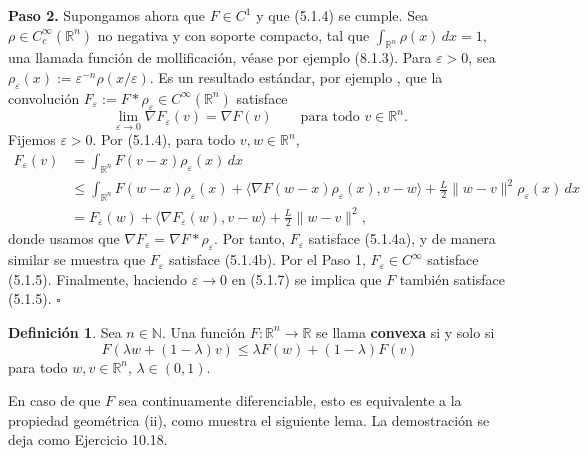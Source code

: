 \documentclass[11pt]{report}
\newenvironment{tcolorbox}[1][]{\par\medskip\noindent\ignorespaces}{\par\medskip}
\theoremstyle{definition}
\newtheorem{definicion}{Definición}[section]
\theoremstyle{plain}
\numberwithin{equation}{section}
\begin{document}
\textbf{Paso 2.} Supongamos ahora que \(F\in C^1\) y que (5.1.4) se cumple. Sea \(\rho\in C^\infty_c(\mathbb{R}^n)\) no negativa y con soporte compacto, tal que \(\int_{\mathbb{R}^n}\rho(x)\,dx=1\), una llamada función de mollificación, véase por ejemplo (8.1.3). Para \(\varepsilon>0\), sea \(\rho_\varepsilon(x):=\varepsilon^{-n}\rho(x/\varepsilon)\). Es un resultado estándar, por ejemplo \cite[Apéndice C.5]{evans-2010}, que la convolución \(F_\varepsilon:=F*\rho_\varepsilon\in C^\infty(\mathbb{R}^n)\) satisface
\begin{equation*}
    \lim_{\varepsilon\to 0}\nabla F_\varepsilon(v)
    =
    \nabla F(v)
    \qquad
    \text{para todo } v\in\mathbb{R}^n.
    \tag{5.1.7}
\end{equation*}
Fijemos \(\varepsilon>0\). Por (5.1.4), para todo \(v,w\in\mathbb{R}^n\),
\begin{align*}
    F_\varepsilon(v)
    &=
    \int_{\mathbb{R}^n}
    F(v-x)\rho_\varepsilon(x)\,dx\\
    &\leq
    \int_{\mathbb{R}^n}
    F(w-x)\rho_\varepsilon(x)
    +
    \langle\nabla F(w-x)\rho_\varepsilon(x),v-w\rangle
    +
    \frac{L}{2}\|w-v\|^2\rho_\varepsilon(x)\,dx\\
    &=
    F_\varepsilon(w)
    +
    \langle\nabla F_\varepsilon(w),v-w\rangle
    +
    \frac{L}{2}\|w-v\|^2,
\end{align*}
donde usamos que \(\nabla F_\varepsilon=\nabla F*\rho_\varepsilon\). Por tanto, \(F_\varepsilon\) satisface (5.1.4a), y de manera similar se muestra que \(F_\varepsilon\) satisface (5.1.4b). Por el Paso 1, \(F_\varepsilon\in C^\infty\) satisface (5.1.5). Finalmente, haciendo \(\varepsilon\to 0\) en (5.1.7) se implica que \(F\) también satisface (5.1.5). \(\square\)

\begin{tcolorbox}[colback=blue!8, colframe=blue!8, boxrule=0pt]
\begin{definicion}
Sea \(n\in\mathbb{N}\). Una función \(F:\mathbb{R}^n\to\mathbb{R}\) se llama \textbf{convexa} si y solo si
\begin{equation*}
    F(\lambda w+(1-\lambda)v)
    \leq
    \lambda F(w)+(1-\lambda)F(v)
    \tag{5.1.8}
\end{equation*}
para todo \(w,v\in\mathbb{R}^n\), \(\lambda\in(0,1)\).
\end{definicion}
\end{tcolorbox}

En caso de que \(F\) sea continuamente diferenciable, esto es equivalente a la propiedad geométrica (ii), como muestra el siguiente lema. La demostración se deja como Ejercicio 10.18.
\end{document}
